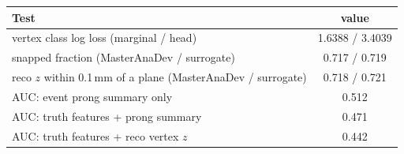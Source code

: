 \begin{tabular}{lc}
\toprule
Test & value \\
\midrule
vertex class log loss (marginal / head) & 1.6388 / 3.4039 \\
snapped fraction (MasterAnaDev / surrogate) & 0.717 / 0.719 \\
reco $z$ within 0.1\,mm of a plane (MasterAnaDev / surrogate) & 0.718 / 0.721 \\
\midrule
AUC: event prong summary only & 0.512 \\
AUC: truth features + prong summary & 0.471 \\
AUC: truth features + reco vertex $z$ & 0.442 \\
\bottomrule
\end{tabular}
